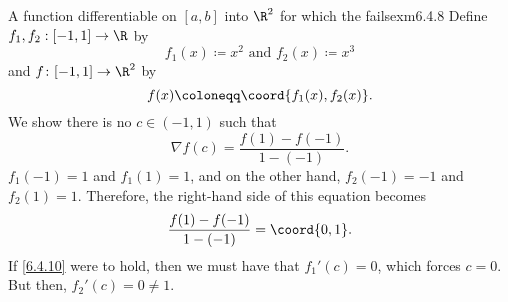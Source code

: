 \begin{exm}{A function differentiable on $[a,b]$ into $\R ^2$ for which the  fails}{exm6.4.8}
Define $f_1,f_2:[-1,1]\rightarrow \R$ by
\begin{equation}
f_1(x)\coloneqq x^2\text{ and }f_2(x)\coloneqq x^3
\end{equation}
and $f\colon [-1,1]\rightarrow \R ^2$ by
\begin{equation}
f(x)\coloneqq \coord{f_1(x),f_2(x)}.
\end{equation}
We show there is no $c\in (-1,1)$ such that
\begin{equation}\label{6.4.10}
\nabla f(c)=\frac{f(1)-f(-1)}{1-(-1)}.
\end{equation}
$f_1(-1)=1$ and $f_1(1)=1$, and on the other hand, $f_2(-1)=-1$ and $f_2(1)=1$.  Therefore, the right-hand side of this equation becomes
\begin{equation}
\frac{f(1)-f(-1)}{1-(-1)}=\coord{0,1}.
\end{equation}
If \eqref{6.4.10} were to hold, then we must have that $f_1'(c)=0$, which forces $c=0$.  But then, $f_2'(c)=0\neq 1$.
\end{exm}

